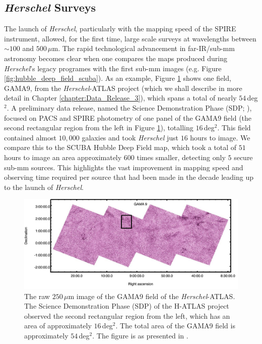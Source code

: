 \subsection{\textit{Herschel} Surveys}

The launch of \textit{Herschel}, particularly with the mapping speed of the SPIRE instrument, allowed, for the first time, large scale surveys at wavelengths between $\sim 100$ and $500\,\mu$m. The rapid technological advancement in far-IR/sub-mm astronomy becomes clear when one compares the maps produced during \textit{Herschel}'s legacy programes with the first sub-mm images (e.g. Figure \ref{fig:hubble_deep_field_scuba}). As an example, Figure \ref{fig:gama9} shows one field, GAMA9, from the \textit{Herschel}-ATLAS project (which we shall describe in more detail in Chapter \ref{chapter:Data_Release_3}), which spans a total of nearly $54\,$deg$^2$. A preliminary data release, named the Science Demonstration Phase (SDP; \citealt{Ibar_2010, Rigby_2011, Pascale_2011}), focused on PACS and SPIRE photometry of one panel of the GAMA9 field (the second rectangular region from the left in Figure \ref{fig:gama9}), totalling $16\,$deg$^2$. This field contained almost $10,000$ galaxies and took \textit{Herschel} just $16$ hours to image. We compare this to the SCUBA Hubble Deep Field map, which took a total of $51$ hours to image an area approximately $600$ times smaller, detecting only $5$ secure sub-mm sources. This highlights the vast improvement in mapping speed and observing time required per source that had been made in the decade leading up to the launch of \textit{Herschel}.

\begin{figure}
    \centering
	\includegraphics[width=0.9\columnwidth]{Figures/GAMA9.pdf}
	\caption[$250\,\mu$m map of the GAMA9 field of H-ATLAS]{The raw $250\,\mu$m image of the GAMA9 field of the \textit{Herschel}-ATLAS. The Science Demonstration Phase (SDP) of the H-ATLAS project observed the second rectangular region from the left, which has an area of approximately $16\,$deg$^2$. The total area of the GAMA9 field is approximately $54\,$deg$^2$. The figure is as presented in \citealt{Valiante_2016}.}
	\label{fig:gama9}
\end{figure}

